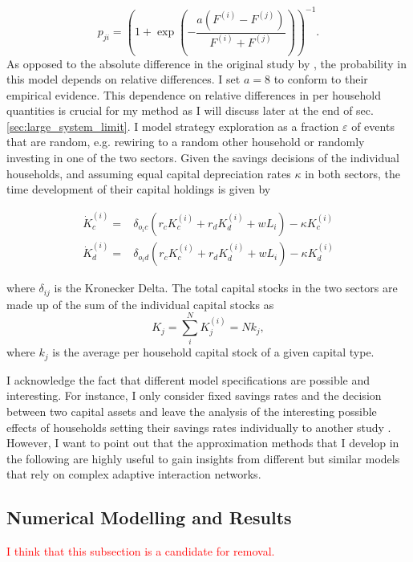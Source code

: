 \begin{equation}
	p_{ji} =  \left(1 + \exp \left(- \frac{a(F^{(i)} - F^{(j)})}{F^{(i)} + F^{(j)}} \right) \right)^{-1}.
    \label{eq:approx_ip}
\end{equation}
As opposed to the absolute difference in the original study by \cite{Traulsen2010}, the probability in this model depends on relative differences. 
I set $a = 8$ to conform to their empirical evidence. This dependence on relative differences in per household quantities is crucial for my method as I will discuss later at the end of sec. \ref{sec:large_system_limit}.
I model strategy exploration as a fraction $\varepsilon$ of events that are random, e.g. rewiring to a random other household or randomly investing in one of the two sectors.
Given the savings decisions of the individual households, and assuming equal capital depreciation rates $\kappa$ in both sectors, the time development of their capital holdings is given by

\begin{align}
	\dot{K}_c^{(i)} =& \delta_{o_ic} \left( r_c K_c^{(i)} + r_d K_d^{(i)} + w L_i \right) - \kappa K_c^{(i)} \label{eq:approx_ci}\\
	\dot{K}_d^{(i)} =& \delta_{o_id} \left( r_c K_c^{(i)} + r_d K_d^{(i)} + w L_i \right) - \kappa K_d^{(i)} \label{eq:approx_di}
\end{align}

where $\delta_{ij}$ is the Kronecker Delta. The total capital stocks in the two sectors are made up of the sum of the individual capital stocks as
\begin{equation}
K_j = \sum_i^N K_j^{(i)} = N k_j,
\end{equation}
where $k_j$ is the average per household capital stock of a given capital type.

I acknowledge the fact that different model specifications are possible and interesting.
For instance, I only consider fixed savings rates and the decision between two capital assets and leave the analysis of the interesting possible effects of households setting their savings rates individually to another study \citep{Asano2019}.
However, I want to point out that the approximation methods that I develop in the following are highly useful to gain insights from different but similar models that rely on complex adaptive interaction networks.


   
\subsection{Numerical Modelling and Results} 
\label{sec:numerical_results}
\textcolor{red}{I think that this subsection is a candidate for removal.}\\

